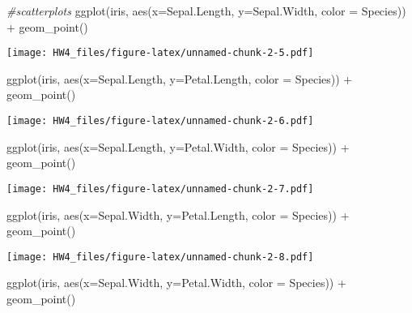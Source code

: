\documentclass[
]{article}
\newenvironment{Shaded}{\begin{snugshade}}{\end{snugshade}}
\newcommand{\AttributeTok}[1]{\textcolor[rgb]{0.77,0.63,0.00}{#1}}
\newcommand{\CommentTok}[1]{\textcolor[rgb]{0.56,0.35,0.01}{\textit{#1}}}
\newcommand{\FunctionTok}[1]{\textcolor[rgb]{0.00,0.00,0.00}{#1}}
\newcommand{\NormalTok}[1]{#1}
\newcommand{\SpecialCharTok}[1]{\textcolor[rgb]{0.00,0.00,0.00}{#1}}
\begin{document}
\begin{Shaded}
\begin{Highlighting}[]
\CommentTok{\#scatterplots}
\FunctionTok{ggplot}\NormalTok{(iris, }\FunctionTok{aes}\NormalTok{(}\AttributeTok{x=}\NormalTok{Sepal.Length, }\AttributeTok{y=}\NormalTok{Sepal.Width, }\AttributeTok{color =}\NormalTok{ Species)) }\SpecialCharTok{+} \FunctionTok{geom\_point}\NormalTok{()}
\end{Highlighting}
\end{Shaded}

\texttt{[image: HW4\_files/figure-latex/unnamed-chunk-2-5.pdf]}

\begin{Shaded}
\begin{Highlighting}[]
\FunctionTok{ggplot}\NormalTok{(iris, }\FunctionTok{aes}\NormalTok{(}\AttributeTok{x=}\NormalTok{Sepal.Length, }\AttributeTok{y=}\NormalTok{Petal.Length, }\AttributeTok{color =}\NormalTok{ Species)) }\SpecialCharTok{+} \FunctionTok{geom\_point}\NormalTok{()}
\end{Highlighting}
\end{Shaded}

\texttt{[image: HW4\_files/figure-latex/unnamed-chunk-2-6.pdf]}

\begin{Shaded}
\begin{Highlighting}[]
\FunctionTok{ggplot}\NormalTok{(iris, }\FunctionTok{aes}\NormalTok{(}\AttributeTok{x=}\NormalTok{Sepal.Length, }\AttributeTok{y=}\NormalTok{Petal.Width, }\AttributeTok{color =}\NormalTok{ Species)) }\SpecialCharTok{+} \FunctionTok{geom\_point}\NormalTok{()}
\end{Highlighting}
\end{Shaded}

\texttt{[image: HW4\_files/figure-latex/unnamed-chunk-2-7.pdf]}

\begin{Shaded}
\begin{Highlighting}[]
\FunctionTok{ggplot}\NormalTok{(iris, }\FunctionTok{aes}\NormalTok{(}\AttributeTok{x=}\NormalTok{Sepal.Width, }\AttributeTok{y=}\NormalTok{Petal.Length, }\AttributeTok{color =}\NormalTok{ Species)) }\SpecialCharTok{+} \FunctionTok{geom\_point}\NormalTok{()}
\end{Highlighting}
\end{Shaded}

\texttt{[image: HW4\_files/figure-latex/unnamed-chunk-2-8.pdf]}

\begin{Shaded}
\begin{Highlighting}[]
\FunctionTok{ggplot}\NormalTok{(iris, }\FunctionTok{aes}\NormalTok{(}\AttributeTok{x=}\NormalTok{Sepal.Width, }\AttributeTok{y=}\NormalTok{Petal.Width, }\AttributeTok{color =}\NormalTok{ Species)) }\SpecialCharTok{+} \FunctionTok{geom\_point}\NormalTok{()}
\end{Highlighting}
\end{Shaded}
\end{document}
